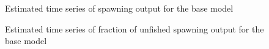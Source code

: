\documentclass[
]{scrartcl}
\begin{document}
\begin{figure}


\caption{\label{fig-es-ssb}Estimated time series of spawning output for
the base model}

\end{figure}%

\begin{figure}


\caption{\label{fig-es-frac-unfished}Estimated time series of fraction
of unfished spawning output for the base model}

\end{figure}%
\end{document}
